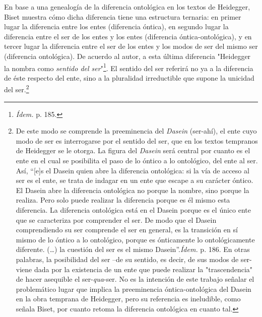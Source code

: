 En base a una genealogía de la diferencia ontológica en los textos de
Heidegger, Biset muestra cómo dicha diferencia tiene una estructura
ternaria: en primer lugar la diferencia entre los entes (diferencia
óntica), en segundo lugar la diferencia entre el ser de los entes y los
entes (diferencia óntica-ontológica), y en tercer lugar la diferencia
entre el ser de los entes y los modos de ser del mismo ser (diferencia
ontológica). De acuerdo al autor, a esta última diferencia "Heidegger la
nombra como \emph{sentido del ser}"\footnote{\emph{Ídem.} p. 185.}. El
sentido del ser referirá no ya a la diferencia de éste respecto del
ente, sino a la pluralidad irreductible que supone la unicidad del
ser.\footnote{De este modo se comprende la preeminencia del
  \emph{Dasein} (ser-ahí), el ente cuyo modo de ser es interrogarse por
  el sentido del ser, que en los textos tempranos de Heidegger se le
  otorga. La figura del \emph{Dasein} será central por cuanto es el ente
  en el cual se posibilita el paso de lo óntico a lo ontológico, del
  ente al ser. Así, ``{[}e{]}s el Dasein quien abre la diferencia
  ontológica: si la vía de acceso al ser es el ente, se trata de indagar
  en un ente que escape a su carácter óntico. El Dasein abre la
  diferencia ontológica no porque la nombre, sino porque la realiza.
  Pero solo puede realizar la diferencia porque es él mismo esta
  diferencia. La diferencia ontológica está en el Dasein porque es el
  único ente que se caracteriza por comprender el ser. De modo que el
  Dasein comprendiendo su ser comprende el ser en general, es la
  transición en sí mismo de lo óntico a lo ontológico, porque es
  ónticamente lo ontológicamente diferente. (\dots) la cuestión del
  ser es el mismo Dasein''.\emph{Ídem.} p. 186. En otras palabras, la
  posibilidad del ser --de su sentido, es decir, de sus modos de ser-
  viene dada por la existencia de un ente que puede realizar la
  "trascendencia" de hacer asequible el ser-\emph{qua}-ser. No es la
  intención de este trabajo señalar el problemático lugar que implica la
  preeminencia óntica-ontológica del Dasein en la obra temprana de
  Heidegger, pero su referencia es ineludible, como señala Biset, por
  cuanto retoma la diferencia ontológica en cuanto tal.}


